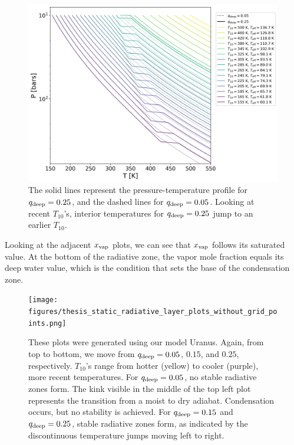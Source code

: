 \documentclass[11pt]{ucscthesisbs}
\begin{document}
\begin{figure}[ht]
 \centerline{
  \includegraphics[scale=0.7]{figures/thesis_static_radiative_layer_plot_diff_qdeep_overlay.png}
 }
\caption[Impact of Radiative Layer on T10]
{The solid lines represent the pressure-temperature profile for $q_{\rm deep} = 0.25$, and the dashed lines for $q_{\rm deep}=0.05$. Looking at recent $T_{10}$'s, interior temperatures for $q_{\rm deep} = 0.25$ jump to an earlier $T_{10}$.}
\label{fig:overlay}
\end{figure}

Looking at the adjacent $x_{\rm vap}$ plots, we can see that $x_{\rm vap}$ follows its saturated value. At the bottom of the radiative zone, the vapor mole fraction equals its deep water value, which is the condition that sets the base of the condensation zone. 

\begin{figure}[ht]
 \centerline{
  \texttt{[image: figures/thesis\_static\_radiative\_layer\_plots\_without\_grid\_points.png]}
 }
\caption[Formation of Radiative Zone]
{These plots were generated using our model Uranus. Again, from top to bottom, we move from $q_{\rm deep} = 0.05$, $0.15$, and $0.25$, respectively. $T_{10}$'s range from hotter (yellow) to cooler (purple), more recent temperatures. For $q_{\rm deep} = 0.05$, no stable radiative zones form. The kink visible in the middle of the top left plot represents the transition from a moist to dry adiabat. Condensation occurs, but no stability is achieved. For $q_{\rm deep} = 0.15$ and $q_{\rm deep} = 0.25$, stable radiative zones form, as indicated by the discontinuous temperature jumps moving left to right.}
\label{fig:radiative}
\end{figure}
\end{document}
